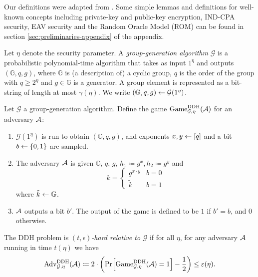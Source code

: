 Our definitions were adapted from \cite{introduction-to-modern-cryptography}. Some simple lemmas and definitions for well-known concepts including private-key and public-key encryption, IND-CPA security, EAV security and the Random Oracle Model (ROM) can be found in section \ref{sec:preliminaries-appendix} of the appendix.

\begin{definition} \label{def:group-generation-algorithm}
	Let $\eta$ denote the security parameter. A \emph{group-generation algorithm} $\mathcal{G}$ is a probabilistic polynomial-time algorithm that takes as input $1^\eta$ and outputs $(\mathbb{G}, q, g)$, where $\mathbb{G}$ is (a description of) a cyclic group, $q$ is the order of the group with $q \ge 2^\eta$ and $g \in \mathbb{G}$ is a generator. A group element is represented as a bit-string of length at most $\gamma(\eta)$. We write $(\mathbb{G}, q, g) \leftarrow \mathcal{G}(1^\eta)$.
\end{definition}

\begin{definition}
	Let $\mathcal{G}$ a group-generation algorithm.
	Define the game $\mathrm{Game}_{\mathcal{G}, \eta}^{\mathrm{DDH}}(\mathcal{A})$ for an adversary $\mathcal{A}$:
	\begin{enumerate}[1.]
		\item $\mathcal{G}(1^\eta)$ is run to obtain $(\mathbb{G}, q, g)$, and exponents $x, y \leftarrow [q]$ and a bit $b \leftarrow \{0, 1\}$ are sampled.
		\item The adversary $\mathcal{A}$ is given $\mathbb{G}$, $q$, $g$, $h_1 \coloneqq g^x, h_2 \coloneqq g^y$ and
		      \[
			      k = \begin{cases}
				      g^{x \cdot y} & b = 0 \\
				      \tilde{k}     & b = 1
			      \end{cases}
		      \]
		      where $\tilde{k} \leftarrow \mathbb{G}$.
		\item $\mathcal{A}$ outputs a bit $b'$. The output of the game is defined to be $1$ if $b' = b$, and $0$ otherwise.
	\end{enumerate}
\end{definition}

\begin{definition}
	The DDH problem is \emph{$(t, \epsilon)$-hard relative to} $\mathcal{G}$ if for all $\eta$, for any adversary $\mathcal{A}$ running in time $t(\eta)$ we have
	\begin{align*}
		\advantage{\mathcal{G}}{\eta}{DDH}(\adv) \coloneqq 2 \cdot \left(\pr{\game{\mathcal{G}}{\eta}{DDH}(\adv) = 1} - \frac{1}{2}\right) \le \epsilon(\eta).
	\end{align*}
\end{definition}

